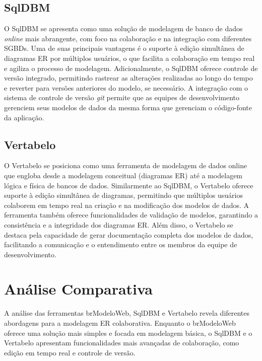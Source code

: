 \subsection[SqlDBM]{SqlDBM}

O SqlDBM se apresenta como uma solução de modelagem de banco de dados \textit{online} mais abrangente, com foco na colaboração e na integração com diferentes SGBDs. Uma de suas principais vantagens é o suporte à edição simultânea de diagramas ER por múltiplos usuários, o que facilita a colaboração em tempo real e agiliza o processo de modelagem. Adicionalmente, o SqlDBM oferece controle de versão integrado, permitindo rastrear as alterações realizadas ao longo do tempo e reverter para versões anteriores do modelo, se necessário. A integração com o sistema de controle de versão \textit{git} permite que as equipes de desenvolvimento gerenciem seus modelos de dados da mesma forma que gerenciam o código-fonte da aplicação.

\subsection[Vertabelo]{Vertabelo}

O Vertabelo se posiciona como uma ferramenta de modelagem de dados online que engloba desde a modelagem conceitual (diagramas ER) até a modelagem lógica e física de bancos de dados. Similarmente ao SqlDBM, o Vertabelo oferece suporte à edição simultânea de diagramas, permitindo que múltiplos usuários colaborem em tempo real na criação e na modificação dos modelos de dados. A ferramenta também oferece funcionalidades de validação de modelos, garantindo a consistência e a integridade dos diagramas ER. Além disso, o Vertabelo se destaca pela capacidade de gerar documentação completa dos modelos de dados, facilitando a comunicação e o entendimento entre os membros da equipe de desenvolvimento.

\section[Análise Comparativa]{Análise Comparativa}

A análise das ferramentas brModeloWeb, SqlDBM e Vertabelo revela diferentes abordagens para a modelagem ER colaborativa. Enquanto o brModeloWeb oferece uma solução mais simples e focada em modelagem básica, o SqlDBM e o Vertabelo apresentam funcionalidades mais avançadas de colaboração, como edição em tempo real e controle de versão.


